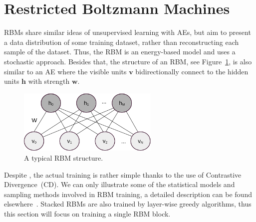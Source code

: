 \section{Restricted Boltzmann Machines \DIFaddbegin {}\DIFaddend }
\label{sec:rbm}
RBMs share similar ideas of unsupervised learning with AEs, but aim to present a data distribution of some training dataset, rather than reconstructing each sample of the dataset.
Thus, the RBM is an energy-based model and uses a stochastic approach.
Besides that, the structure of an RBM, see Figure~\ref{fig:RBM}, is also similar to an AE where the visible units $\mathbf{v}$ bidirectionally connect to the hidden units $\mathbf{h}$ with strength $\mathbf{w}$.


\begin{figure}[hbt]
	\centering
	\includegraphics[width=0.6\textwidth]{pics_sdlm/rbm_o.pdf}
	\caption{A typical RBM structure.}
	\label{fig:RBM}
\end{figure}

Despite \DIFdelbegin {}\DIFdelend \DIFaddbegin {}\DIFaddend , the actual training \DIFdelbegin {}\DIFdelend \DIFaddbegin {}\DIFaddend is rather simple thanks to the use of Contrastive Divergence~(CD)\DIFdelbegin {}\DIFdelend \DIFaddbegin {}\DIFaddend .
We can only illustrate some of the statistical models and sampling methods involved in RBM training, a detailed description can be found elsewhere~\citep{fischer2012introduction}. 
Stacked RBMs are also trained by layer-wise greedy algorithms, thus this section will focus on training a single RBM block.

